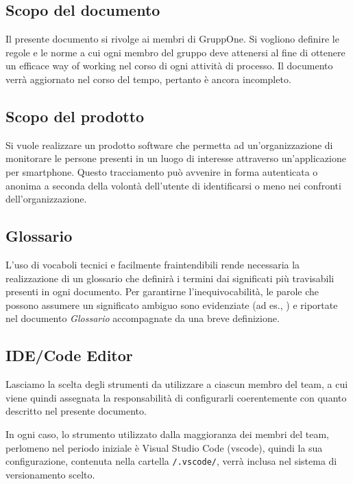 \documentclass[../norme-di-progetto.tex]{subfiles}
\begin{document}
\subsection{Scopo del documento}%
\label{sub:scopo_del_documento}

Il presente documento si rivolge ai membri di GruppOne.
Si vogliono definire le regole e le norme a cui ogni membro del gruppo deve attenersi al fine di ottenere un efficace way of working nel corso di ogni attività di processo.
Il documento verrà aggiornato nel corso del tempo, pertanto è ancora incompleto.

\subsection{Scopo del prodotto}%
\label{sub:scopo_del_prodotto}

Si vuole realizzare un prodotto software che permetta ad un'organizzazione di monitorare le persone presenti in un luogo di interesse attraverso un'applicazione per smartphone.
Questo tracciamento può avvenire in forma autenticata o anonima a seconda della volontà dell'utente di identificarsi o meno nei confronti dell'organizzazione.

\subsection{Glossario}%
\label{sub:glossario}

L'uso di vocaboli tecnici e facilmente fraintendibili rende necessaria la realizzazione di un glossario che definirà i termini dai significati più travisabili presenti in ogni documento.
Per garantirne l'inequivocabilità, le parole che possono assumere un significato ambiguo sono evidenziate (ad es., ) e riportate nel documento \textit{Glossario} accompagnate da una breve definizione.

\subsection{IDE/Code Editor}%
\label{sub:ide_code_editor}

Lasciamo la scelta degli strumenti da utilizzare a ciascun membro del team, a cui viene quindi assegnata la responsabilità di configurarli coerentemente con quanto descritto nel presente documento.

In ogni caso, lo strumento utilizzato dalla maggioranza dei membri del team, perlomeno nel periodo iniziale è Visual Studio Code (vscode), quindi la sua configurazione, contenuta nella cartella \verb|/.vscode/|, verrà inclusa nel sistema di versionamento scelto.
\end{document}
